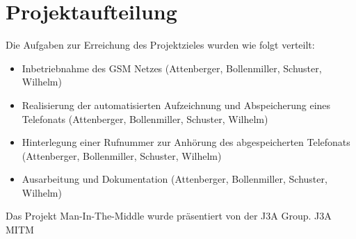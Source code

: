 \section{Projektaufteilung}
Die Aufgaben zur Erreichung des Projektzieles wurden wie folgt verteilt:

\begin{itemize}
\item Inbetriebnahme des GSM Netzes (Attenberger, Bollenmiller, Schuster, Wilhelm)
\item Realisierung der automatisierten Aufzeichnung und Abspeicherung eines Telefonats (Attenberger, Bollenmiller, Schuster, Wilhelm)
\item Hinterlegung einer Rufnummer zur Anhörung des abgespeicherten Telefonats (Attenberger, Bollenmiller, Schuster, Wilhelm)
\item Ausarbeitung und Dokumentation (Attenberger, Bollenmiller, Schuster, Wilhelm)
\end{itemize}

Das Projekt Man-In-The-Middle wurde präsentiert von der J3A Group. \textsuperscript{\textcopyright} J3A MITM